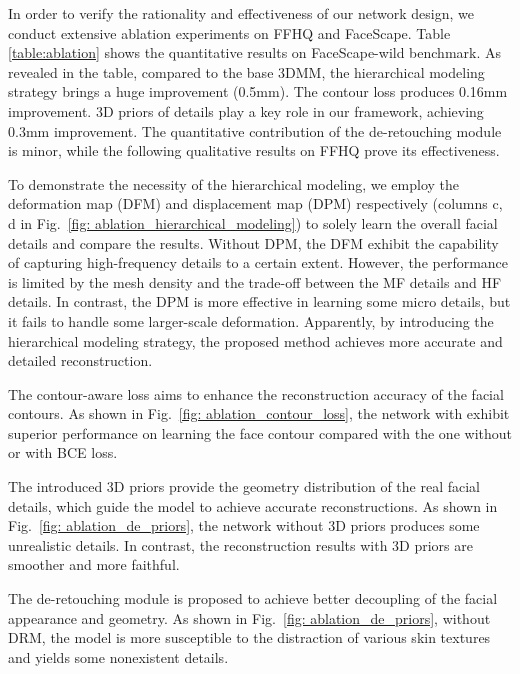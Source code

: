 \documentclass[10pt,twocolumn,letterpaper]{article}
\begin{document}
In order to verify the rationality and effectiveness of our network design, we conduct extensive ablation experiments on FFHQ and FaceScape. Table \ref{table:ablation} shows the quantitative results on FaceScape-wild benchmark. As revealed in the table, compared to the base 3DMM, the hierarchical modeling strategy brings a huge improvement (0.5mm). The contour loss produces 0.16mm improvement. 3D priors of details play a key role in our framework, achieving 0.3mm improvement. The quantitative contribution of the de-retouching module is minor, while the following qualitative results on FFHQ prove its effectiveness.

 To demonstrate the necessity of the hierarchical modeling, we employ the deformation map (DFM) and displacement map (DPM) respectively (columns c, d in Fig.~\ref{fig: ablation_hierarchical_modeling}) to solely learn the overall facial details and compare the results. Without DPM, the DFM exhibit the capability of capturing high-frequency details to a certain extent. However, the performance is limited by the mesh density and the trade-off between the MF details and HF details. In contrast, the DPM is more effective in learning some micro details, but it fails to handle some larger-scale deformation. Apparently, by introducing the hierarchical modeling strategy, the proposed method achieves more accurate and detailed reconstruction.


 The contour-aware loss  aims to enhance the reconstruction accuracy of the facial contours. As shown in Fig.~\ref{fig: ablation_contour_loss}, the network with  exhibit superior performance on learning the face contour compared with the one without  or with BCE loss.

 The introduced 3D priors provide the geometry distribution of the real facial details, which guide the model to achieve accurate reconstructions. As shown in Fig.~\ref{fig: ablation_de_priors}, the network without 3D priors produces some unrealistic details. In contrast, the reconstruction results with 3D priors are smoother and more faithful.

 The de-retouching module is proposed to achieve better decoupling of the facial appearance and geometry. As shown in Fig.~\ref{fig: ablation_de_priors}, without DRM, the model is more susceptible to the distraction of various skin textures and yields some nonexistent details. 
\end{document}

